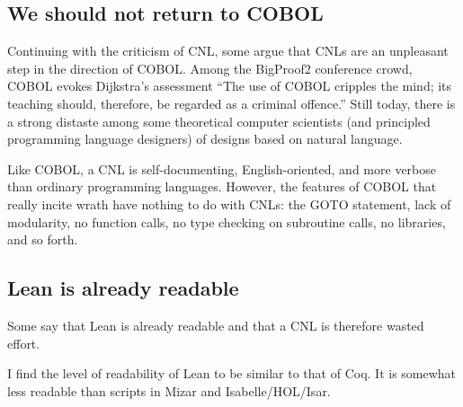\documentclass[12pt]{amsart}
\renewcommand{\~}{\ }
\renewcommand{\_}{\textunderscore}
\begin{document}
\subsection{We should not return to COBOL}

Continuing with the criticism of CNL, some argue that CNLs are an
unpleasant step in the direction of COBOL.  Among the BigProof2 conference crowd,
COBOL evokes Dijkstra's assessment ``The use of COBOL cripples the
mind; its teaching should, therefore, be regarded as a criminal
offence.''  Still today, there is a strong distaste among some theoretical
computer scientists (and principled programming language designers) of
designs based on natural language.

Like COBOL, a CNL is self-documenting, English-oriented, and more
verbose than ordinary programming languages.  However, the features of
COBOL that really incite wrath have nothing to do with CNLs: the GOTO
statement, lack of modularity, no function calls, no type checking on
subroutine calls, no libraries, and so forth.





\subsection{Lean is already readable}

Some say that Lean is already readable and that a CNL is therefore
wasted effort.

I find the level of readability of Lean to be similar to that of Coq.
It is somewhat less readable than scripts in Mizar and
Isabelle/HOL/Isar.
\end{document}
